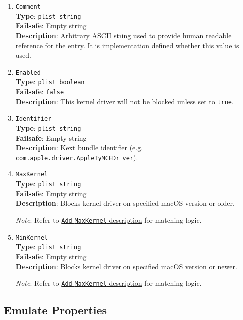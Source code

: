 \documentclass[]{article}
\begin{document}
\begin{enumerate}
\item
  \texttt{Comment}\\
  \textbf{Type}: \texttt{plist\ string}\\
  \textbf{Failsafe}: Empty string\\
  \textbf{Description}: Arbitrary ASCII string used to provide human readable
  reference for the entry. It is implementation defined whether this value is
  used.

\item
  \texttt{Enabled}\\
  \textbf{Type}: \texttt{plist\ boolean}\\
  \textbf{Failsafe}: \texttt{false}\\
  \textbf{Description}: This kernel driver will not be blocked unless set to
  \texttt{true}.

\item
  \texttt{Identifier}\\
  \textbf{Type}: \texttt{plist\ string}\\
  \textbf{Failsafe}: Empty string\\
  \textbf{Description}: Kext bundle identifier
    (e.g. \texttt{com.apple.driver.AppleTyMCEDriver}).

\item
  \texttt{MaxKernel}\\
  \textbf{Type}: \texttt{plist\ string}\\
  \textbf{Failsafe}: Empty string\\
  \textbf{Description}: Blocks kernel driver on specified macOS version or older.

  \emph{Note}: Refer to \hyperlink{kernmatch}{\texttt{Add} \texttt{MaxKernel} description} for matching logic.

\item
  \texttt{MinKernel}\\
  \textbf{Type}: \texttt{plist\ string}\\
  \textbf{Failsafe}: Empty string\\
  \textbf{Description}: Blocks kernel driver on specified macOS version or newer.

  \emph{Note}: Refer to \hyperlink{kernmatch}{\texttt{Add} \texttt{MaxKernel} description} for matching logic.

\end{enumerate}

\subsection{Emulate Properties}\label{kernelpropsemu}
\end{document}
